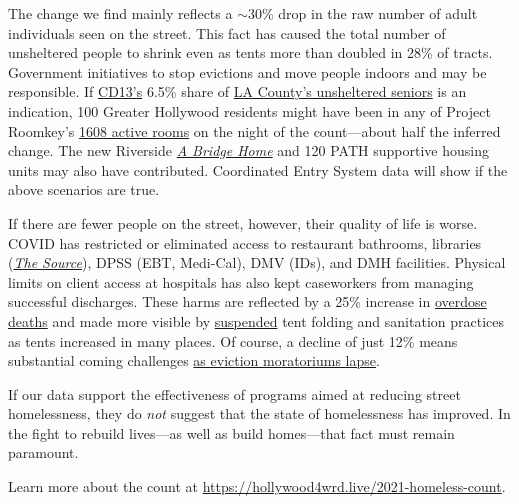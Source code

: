 \documentclass[11pt]{article}
\begin{document}
 The change we find mainly reflects a $\sim$30\% drop in the raw number
of adult individuals seen on the street. This fact has caused the total number of unsheltered people to shrink 
even as tents more than doubled in 28\% of tracts. Government initiatives to stop evictions and move 
people indoors and may be responsible. If \href{https://www.lahsa.org/documents?id=4672-2020-homeless-count-council-district-13}{CD13's} 6.5\% share of \href{https://www.lahsa.org/documents?id=4585-2020-greater-los-angeles-homeless-count-los-angeles-continuum-of-care-coc-}{LA County's unsheltered seniors} 
is an indication, 100 Greater Hollywood residents might have been in any of Project Roomkey's 
\href{https://projectroomkeytracker.com/}{1608 active rooms} on the night of the count---about half the 
inferred change. The new Riverside \href{https://www.lamayor.org/ABridgeHome}
{\it A Bridge Home} and 120 PATH supportive housing units may also have contributed.
Coordinated Entry System data will show if the above scenarios are true.

If there are fewer people on the street, however, their quality of life is worse. 
COVID has restricted or eliminated access to restaurant bathrooms, libraries 
(\href{https://www.lapl.org/homeless-resources/the-source}{\it The Source}), DPSS 
(EBT, Medi-Cal), DMV (IDs), and DMH facilities. Physical limits on client access at 
hospitals has also kept caseworkers from managing successful discharges. These harms 
are reflected by a 25\% increase in 
\href{https://www.latimes.com/california/story/2021-01-07/the-powerful-synthetic-opioid-fentanyl-is-behind-rising-deaths-in-the-homeless-population}{overdose deaths} and made more visible by \href{https://clkrep.lacity.org/onlinedocs/2020/20-0147_misc_3-17-20_p.pdf}{suspended}
tent folding and sanitation practices as tents increased in many places. 
Of course, a decline of just 12\% means substantial coming challenges
 \href{https://www.latimes.com/california/story/2021-01-12/new-report-foresees-tens-of-thousands-losing-homes-by-2023}
{as eviction moratoriums lapse}.

If our data support the effectiveness of programs aimed at reducing street homelessness, 
they do {\it not} suggest that the state of homelessness has improved. In the fight to rebuild lives---as well 
as build homes---that fact must remain paramount.

Learn more about the count at \url{https://hollywood4wrd.live/2021-homeless-count}.

\end{document}
